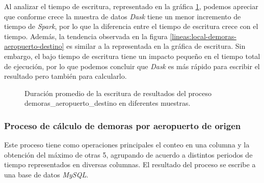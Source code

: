 Al analizar el tiempo de escritura, representado en la gráfica \ref{lineas:local-demoras-aeropuerto-destino-write}, podemos apreciar que conforme crece la muestra de datos \textit{Dask} tiene un menor incremento de tiempo de \textit{Spark}, por lo que la diferencia entre el tiempo de escritura crece con el tiempo. Además, la tendencia observada en la figura \ref{lineas:local-demoras-aeropuerto-destino} es similar a la representada en la gráfica de escritura. Sin embargo, el bajo tiempo de escritura tiene un impacto pequeño en el tiempo total de ejecución, por lo que podemos concluir que \textit{Dask} es más rápido para escribir el resultado pero también para calcularlo.

\begin{figure}
\centering
{}
\caption{Duración promedio de la escritura de resultados del proceso demoras\_aeropuerto\_destino en diferentes muestras.}
\label{lineas:local-demoras-aeropuerto-destino-write}
\end{figure}

\subsubsection{Proceso de cálculo de demoras por aeropuerto de origen}

Este proceso tiene como operaciones principales el conteo en una columna y la obtención del máximo de otras 5, agrupando de acuerdo a distintos periodos de tiempo representados en diversas columnas. El resultado del proceso se escribe a una base de datos \textit{MySQL}.

